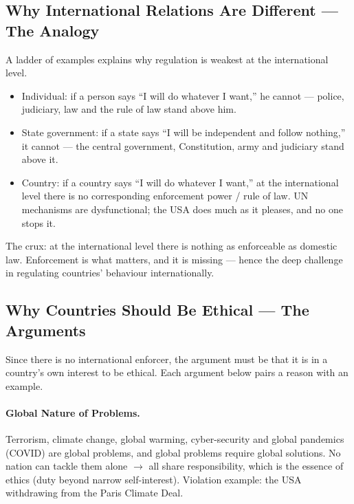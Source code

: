 \subsection{Why International Relations Are Different --- The Analogy}
A ladder of examples explains why regulation is weakest at the international level.

\begin{KeyConcept}
\begin{itemize}
\item Individual: if a person says ``I will do whatever I want,'' he cannot --- police, judiciary, law and the rule of law stand above him.
\item State government: if a state says ``I will be independent and follow nothing,'' it cannot --- the central government, Constitution, army and judiciary stand above it.
\item Country: if a country says ``I will do whatever I want,'' at the international level there is no corresponding enforcement power / rule of law. UN mechanisms are dysfunctional; the USA does much as it pleases, and no one stops it.
\end{itemize}
\end{KeyConcept}

\begin{CriticalPoint}
The crux: at the international level there is nothing as enforceable as domestic law. Enforcement is what matters, and it is missing --- hence the deep challenge in regulating countries' behaviour internationally.
\end{CriticalPoint}

\subsection{Why Countries Should Be Ethical --- The Arguments}
Since there is no international enforcer, the argument must be that it is in a country's own interest to be ethical. Each argument below pairs a reason with an example.

\paragraph{Global Nature of Problems.}
\begin{KeyConcept}
Terrorism, climate change, global warming, cyber-security and global pandemics (COVID) are global problems, and global problems require global solutions. No nation can tackle them alone $\rightarrow$ all share responsibility, which is the essence of ethics (duty beyond narrow self-interest). Violation example: the USA withdrawing from the Paris Climate Deal.
\end{KeyConcept}

